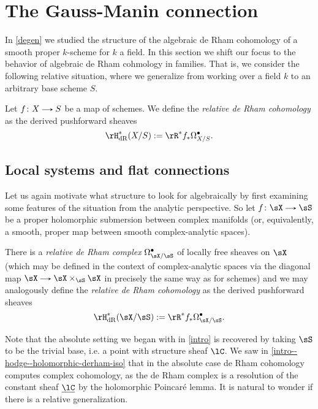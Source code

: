 \section{The Gauss-Manin connection}
\label{gm}

In \cref{degen} we studied the structure of the algebraic de Rham cohomology of a smooth proper $k$-scheme for $k$ a field. In this section we shift our focus to the behavior of algebraic de Rham cohmology in families. That is, we consider the following relative situation, where we generalize from working over a field $k$ to an arbitrary base scheme $S$.

\begin{definition}
  \label{gm--relative-algebraic-derham}
  Let $f \c X \to S$ be a map of schemes. We define the \emph{relative de Rham cohomology} as the derived pushforward sheaves
  \[
    \rH^*_{\dR}(X/S) \ce \rR^*f_*\Omega^\bullet_{X/S}.
  \]
\end{definition}


\subsection{Local systems and flat connections}
\label{gm--local}

Let us again motivate what structure to look for algebraically by first examining some features of the situation from the analytic perspective. So let $f \c \sX \to \sS$ be a proper holomorphic submersion between complex manifolds (or, equivalently, a smooth, proper map between smooth complex-analytic spaces).

\begin{definition}
  \label{gm--local--derham}
  There is a \emph{relative de Rham complex} $\Omega_{\sX/\sS}^\bullet$ of locally free sheaves on $\sX$ (which may be defined in the context of complex-analytic spaces via the diagonal map $\sX \to \sX \times_\sS \sX$ in precisely the same way as for schemes) and we may analogously define the \emph{relative de Rham cohomology} as the derived pushforward sheaves
  \[
    \rH^*_{\dR}(\sX/\sS) \ce \rR^*f_*\Omega^\bullet_{\sX/\sS}.
  \]
\end{definition}

Note that the absolute setting we began with in \cref{intro} is recovered by taking $\sS$ to be the trivial base, i.e. a point with structure sheaf $\lC$. We saw in \cref{intro--hodge--holomorphic-derham-iso} that in the absolute case de Rham cohomology computes complex cohomology, as the de Rham complex is a resolution of the constant sheaf $\u\lC$ by the holomorphic Poincar\'e lemma. It is natural to wonder if there is a relative generalization.


